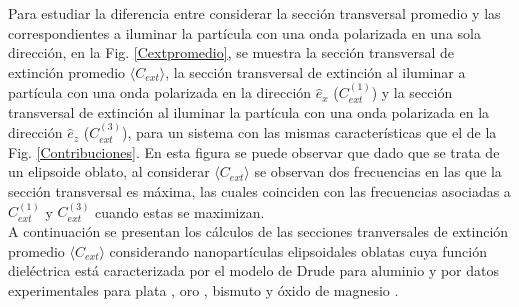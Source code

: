  Para estudiar la diferencia entre considerar la sección transversal promedio y las correspondientes a iluminar la partícula con una onda polarizada en una sola dirección, en la Fig. \ref{Cextpromedio}, se muestra la sección transversal de extinción promedio $\langle C_{ext}\rangle$, la sección transversal de extinción al iluminar a partícula con una onda polarizada en la dirección $\hat{e}_x$ ($C_{ext}^{(1)}$)  y la sección transversal de extinción al iluminar la partícula con una onda polarizada en la dirección $\hat{e}_z$ ($C_{ext}^{(3)}$), para un sistema con las mismas características que el de la Fig. \ref{Contribuciones}. En esta figura se puede observar que dado que se trata de un elipsoide oblato, al considerar $\langle C_{ext}\rangle$ se observan dos frecuencias en las que la sección transversal es máxima, las cuales coinciden con las frecuencias asociadas a $C_{ext}^{(1)}$ y $C_{ext}^{(3)}$ cuando estas se maximizan. \\

A continuación se presentan los cálculos de las secciones tranversales de extinción promedio  $\langle C_{ext}\rangle$ considerando nanopartículas elipsoidales oblatas cuya función dieléctrica está caracterizada por el modelo de Drude para aluminio \cite{Aluminio} y por datos experimentales para plata \cite{Plata}, oro \cite{Plata}, bismuto \cite{Bismuto} y  óxido de magnesio \cite{MgO}.



